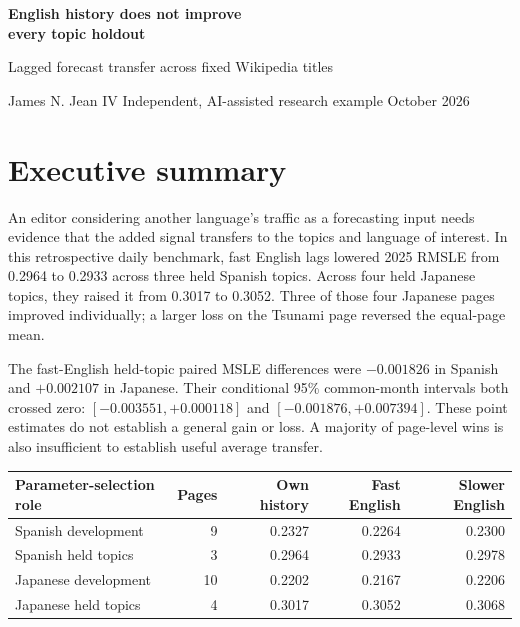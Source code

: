 \documentclass[11pt,letterpaper]{article}
\begin{document}
{\LARGE\bfseries English history does not improve\\every topic holdout\par}
\vspace{8pt}
{\large Lagged forecast transfer across fixed Wikipedia titles\par}
{\small James N. Jean IV \quad Independent, AI-assisted research example  October 2026\par}
\section*{Executive summary}
An editor considering another language's traffic as a forecasting input needs evidence that the added signal transfers to the topics and language of interest. In this retrospective daily benchmark, fast English lags lowered 2025 RMSLE from 0.2964 to 0.2933 across three held Spanish topics. Across four held Japanese topics, they raised it from 0.3017 to 0.3052. Three of those four Japanese pages improved individually; a larger loss on the Tsunami page reversed the equal-page mean.

The fast-English held-topic paired MSLE differences were $-0.001826$ in Spanish and $+0.002107$ in Japanese. Their conditional 95\% common-month intervals both crossed zero: $[-0.003551,\allowbreak +0.000118]$ and $[-0.001876,\allowbreak +0.007394]$. These point estimates do not establish a general gain or loss. A majority of page-level wins is also insufficient to establish useful average transfer.

\begin{center}\small
\begin{tabular}{lrrrr}\toprule
Parameter-selection role & Pages & Own history & Fast English & Slower English\\\midrule
Spanish development & 9 & 0.2327 & 0.2264 & 0.2300\\
Spanish held topics & 3 & 0.2964 & 0.2933 & 0.2978\\
Japanese development & 10 & 0.2202 & 0.2167 & 0.2206\\
Japanese held topics & 4 & 0.3017 & 0.3052 & 0.3068\\\bottomrule
\end{tabular}
\end{center}
\end{document}
